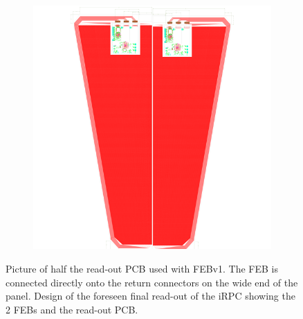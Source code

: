 \begin{figure}[H]
\begin{subfigure}{0.6\linewidth}
			\includegraphics[width = \linewidth]{fig/chapt6/iRPC-RPCROC-Final.png}
			\caption{\label{fig:RPCROC_FEB:B}}
		\end{subfigure}
		\caption{\label{fig:RPCROC_FEB}  Picture of half the read-out PCB used with FEBv1. The FEB is connected directly onto the return connectors on the wide end of the panel.  Design of the foreseen final read-out of the iRPC showing the 2 FEBs and the read-out PCB.}
	\end{figure}
	

